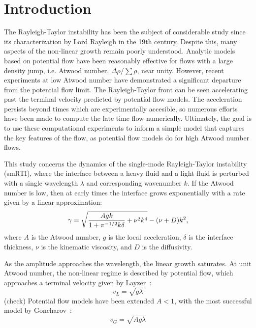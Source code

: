 \section{Introduction}

The Rayleigh-Taylor instability has been the subject of considerable study since its characterization by Lord Rayleigh in the 19th century.
Despite this, many aspects of the non-linear growth remain poorly understood.
Analytic models based on potential flow have been reasonably effective for flows with a large density jump, i.e. Atwood number, $\Delta \rho / \sum \rho$, near unity.
However, recent experiments at low Atwood number have demonstrated a significant departure from the potential flow limit.
The Rayleigh-Taylor front can be seen accelerating past the terminal velocity predicted by potential flow models.
The acceleration persists beyond times which are experimentally accesible, so numerous efforts have been made to compute the late time flow numerically.
Ultimately, the goal is to use these computational experiments to inform a simple model that captures the key features of the flow, as potential flow models do for high Atwood number flows.

This study concerns the dynamics of the single-mode Rayleigh-Taylor instability (smRTI), where the interface between a heavy fluid and a light fluid is perturbed with a single wavelength $\lambda$ and corresponding wavenumber $k$.
If the Atwood number is low, then at early times the interface grows exponentially with a rate given by a linear approximation:
\begin{equation} \elabel{duff0}
\gamma = \sqrt{\frac{A g k}{1 + \pi^{-1/2} k \delta} + \nu^2 k^4} - (\nu + D) k^2,
\end{equation}
where $A$ is the Atwood number,
$g$ is the local acceleration,
$\delta$ is the interface thickness,
$\nu$ is the kinematic viscosity, and
$D$ is the diffusivity.

As the amplitude approaches the wavelength, the linear growth saturates.
At unit Atwood number, the non-linear regime is described by potential flow, which approaches a terminal velocity given by Layzer~\cite{Layzer1955}:
\begin{equation}
v_L = \sqrt{g \lambda}
\end{equation}
(check)
Potential flow models have been extended $A < 1$, with the most successful model by Goncharov~\cite{Goncharov2002}:
\begin{equation}
v_G = \sqrt{A g \lambda}
\end{equation}

